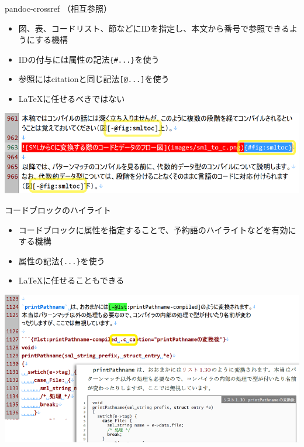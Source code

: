 \documentclass[14pt,dvipdfmx,uplatex]{beamer}
\begin{document}
\begin{frame}[t]{\inhibitglue pandoc-crossref （相互参照）}
  \sffamily
  \begin{itemize}
    \item 図、表、コードリスト、節などにIDを指定し、本文から番号で参照できるようにする機構
    \item IDの付与には属性の記法\texttt{\{\#...\}}を使う
    \item 参照にはcitationと同じ記法\texttt{[@...]}を使う
    \item \LaTeX{}に任せるべきではない
  \end{itemize}
  \begin{center}
  \includegraphics[width=.9\textwidth]{figures/crossref.png}\\
  \end{center}
\end{frame}

\begin{frame}[t]{\inhibitglue コードブロックのハイライト}
  \sffamily
  \begin{itemize}
    \item コードブロックに属性を指定することで、予約語のハイライトなどを有効にする機構
    \item 属性の記法\texttt{\{...\}}を使う
    \item \LaTeX{}に任せることもできる
  \end{itemize}
  \begin{center}
  \includegraphics[width=.8\textwidth]{figures/code-highlight.png}\\
  \end{center}
\end{frame}
\end{document}
